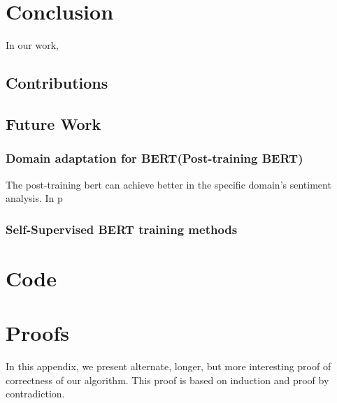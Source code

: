 \documentclass[fyp]{socreport}
\begin{document}

\chapter{Conclusion}
In our work,
\section{Contributions}
\section{Future Work}
\subsection{Domain adaptation for BERT(Post-training BERT)}
The post-training bert can achieve better in the specific domain's sentiment analysis. In p

\subsection{Self-Supervised BERT training methods}





% 
% 


\appendix
\chapter{Code}

\chapter{Proofs}
In this appendix, we present alternate, longer, but more interesting proof 
of correctness of our algorithm.  This proof is based on induction and proof
by contradiction.
\end{document}
